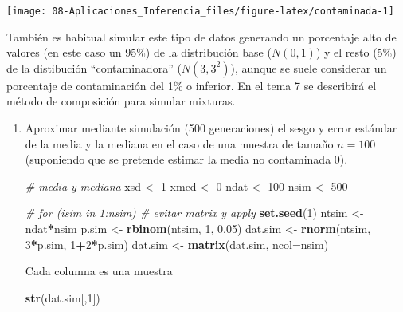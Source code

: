 \documentclass[
]{book}
\newenvironment{Shaded}{\begin{snugshade}}{\end{snugshade}}
\newcommand{\CommentTok}[1]{\textcolor[rgb]{0.56,0.35,0.01}{\textit{#1}}}
\newcommand{\DataTypeTok}[1]{\textcolor[rgb]{0.13,0.29,0.53}{#1}}
\newcommand{\DecValTok}[1]{\textcolor[rgb]{0.00,0.00,0.81}{#1}}
\newcommand{\FloatTok}[1]{\textcolor[rgb]{0.00,0.00,0.81}{#1}}
\newcommand{\KeywordTok}[1]{\textcolor[rgb]{0.13,0.29,0.53}{\textbf{#1}}}
\newcommand{\NormalTok}[1]{#1}
\newcommand{\OperatorTok}[1]{\textcolor[rgb]{0.81,0.36,0.00}{\textbf{#1}}}
\newcommand{\StringTok}[1]{\textcolor[rgb]{0.31,0.60,0.02}{#1}}
\theoremstyle{break}
\theoremstyle{definition}
\theoremstyle{definition}
\theoremstyle{definition}
\theoremstyle{remark}
\let\BeginKnitrBlock\begin \let\EndKnitrBlock\end
\begin{document}
\begin{center}\texttt{[image: 08-Aplicaciones\_Inferencia\_files/figure-latex/contaminada-1]} \end{center}

\BeginKnitrBlock{remark}
{}También es habitual simular este tipo de datos generando un porcentaje alto de valores (en este caso un 95\%) de la distribución base (\(N(0,1)\)) y el resto (5\%) de la distibución ``contaminadora'' (\(N(3,3^2)\)), aunque se suele considerar un porcentaje de contaminación del 1\% o inferior. En el tema 7 se describirá el método de composición para simular mixturas.
\EndKnitrBlock{remark}

\vspace{0.5cm}

\begin{enumerate}
\def\labelenumi{\alph{enumi})}
\item
  Aproximar mediante simulación (500 generaciones) el sesgo y
  error estándar de la media y la mediana en el caso de una
  muestra de tamaño \(n=100\) (suponiendo que se pretende estimar la
  media no contaminada 0).

\begin{Shaded}
\begin{Highlighting}[]
\CommentTok{# media y mediana}
\NormalTok{xsd <-}\StringTok{ }\DecValTok{1}
\NormalTok{xmed <-}\StringTok{ }\DecValTok{0}
\NormalTok{ndat <-}\StringTok{ }\DecValTok{100}
\NormalTok{nsim <-}\StringTok{ }\DecValTok{500}

\CommentTok{# for (isim in 1:nsim) # evitar matrix y apply}
\KeywordTok{set.seed}\NormalTok{(}\DecValTok{1}\NormalTok{)}
\NormalTok{ntsim <-}\StringTok{ }\NormalTok{ndat}\OperatorTok{*}\NormalTok{nsim}
\NormalTok{p.sim <-}\StringTok{ }\KeywordTok{rbinom}\NormalTok{(ntsim, }\DecValTok{1}\NormalTok{, }\FloatTok{0.05}\NormalTok{)}
\NormalTok{dat.sim <-}\StringTok{ }\KeywordTok{rnorm}\NormalTok{(ntsim, }\DecValTok{3}\OperatorTok{*}\NormalTok{p.sim, }\DecValTok{1}\OperatorTok{+}\DecValTok{2}\OperatorTok{*}\NormalTok{p.sim)}
\NormalTok{dat.sim <-}\StringTok{ }\KeywordTok{matrix}\NormalTok{(dat.sim, }\DataTypeTok{ncol=}\NormalTok{nsim)}
\end{Highlighting}
\end{Shaded}

  Cada columna es una muestra

\begin{Shaded}
\begin{Highlighting}[]
\KeywordTok{str}\NormalTok{(dat.sim[,}\DecValTok{1}\NormalTok{])}
\end{Highlighting}
\end{Shaded}


\end{enumerate}
\end{document}
